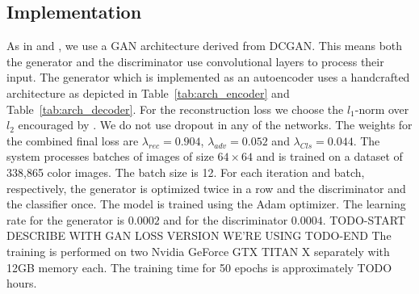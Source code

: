 \documentclass[12pt,a4paper]{article}
\begin{document}
\subsection{Implementation}
As in \cite{DisentFacOfVarByMixTh} and \cite{InfoGAN}, we use a GAN architecture derived from DCGAN. This means both the generator and the discriminator use convolutional layers to process their input. The generator which is implemented as an autoencoder uses a handcrafted architecture as depicted in Table~\ref{tab:arch_encoder} and Table~\ref{tab:arch_decoder}. For the reconstruction loss we choose the $l_1$-norm over $l_2$ encouraged by \cite{CondGAN_PatchGAN}. We do not use dropout in any of the networks. The weights for the combined final loss are $ \lambda_{rec} = 0.904$, $\lambda_{adv} = 0.052$ and $ \lambda_{Cls} = 0.044$. The system processes batches of images of size $64 \times 64$ and is trained on a dataset of 338,865 color images. The batch size is 12. For each iteration and batch, respectively, the generator is optimized twice in a row and the discriminator and the classifier once. The model is trained using the Adam optimizer. The learning rate for the generator is $0.0002$ and for the discriminator $0.0004$. TODO-START DESCRIBE WITH GAN LOSS VERSION WE'RE USING TODO-END The training is performed on two Nvidia GeForce GTX TITAN X separately with 12GB memory each. The training time for 50 epochs is approximately TODO hours.
\end{document}

